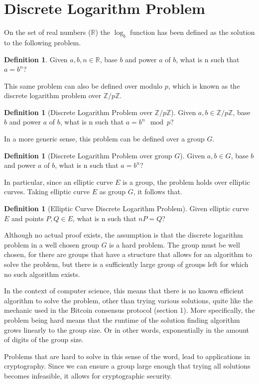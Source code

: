 \documentclass[12pt]{report}
\theoremstyle{plain}
\theoremstyle{definition}
\newtheorem{defn}[thm]{Definition} %
\begin{document}
	\section{Discrete Logarithm Problem}
	On the set of real numbers ($\mathbb{R}$) the $\log_b$ function has been defined as the solution to the following problem.
	\begin{defn}
		Given $a,b,n\in\mathbb{R}$, base $b$ and power $a$ of $b$, what is n such that $a=b^n$?
	\end{defn}
	This same problem can also be defined over modulo $p$, which is known as the discrete logarithm problem over $\mathbb{Z}/p\mathbb{Z}$.
	\begin{defn}[Discrete Logarithm Problem over $\mathbb{Z}/p\mathbb{Z}$]
		Given $a,b\in\mathbb{Z}/p\mathbb{Z}$, base $b$ and power $a$ of $b$, what is n such that $a=b^n\mod{p}$?
	\end{defn}
	In a more generic sense, this problem can be defined over a group $G$.
	\begin{defn}[Discrete Logarithm Problem over group $G$]
		Given $a,b\in G$, base $b$ and power $a$ of $b$, what is n such that $a=b^n$?
	\end{defn}
	In particular, since an elliptic curve $E$ is a group, the problem holds over elliptic curves. Taking elliptic curve $E$ as group $G$, it follows that.
	\begin{defn}[Elliptic Curve Discrete Logarithm Problem]
		Given elliptic curve $E$ and points $P,Q\in E$, what is n such that $nP=Q$?
	\end{defn}
	Although no actual proof exists, the assumption is that the discrete logarithm problem in a well chosen group $G$ is a hard problem. The group must be well chosen, for there are groups that have a structure that allows for an algorithm to solve the problem, but there is a sufficiently large group of groups left for which no such algorithm exists.
	
	In the context of computer science, this means that there is no known efficient algorithm to solve the problem, other than trying various solutions, quite like the mechanic used in the Bitcoin consensus protocol (section 1). More specifically, the problem being hard means that the runtime of the solution finding algorithm grows linearly to the group size. Or in other words, exponentially in the amount of digits of the group size.
	
	Problems that are hard to solve in this sense of the word, lead to applications in cryptography. Since we can ensure a group large enough that trying all solutions becomes infeasible, it allows for cryptographic security.
	
\end{document}

